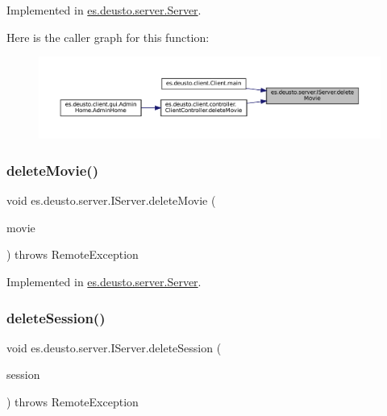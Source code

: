 Implemented in \mbox{\hyperlink{classes_1_1deusto_1_1server_1_1_server_a6501e4103fcc2ef691c15e4e02f7136c}{es.\+deusto.\+server.\+Server}}.

Here is the caller graph for this function\+:
\nopagebreak
\begin{figure}[H]
\begin{center}
\leavevmode
\includegraphics[width=350pt]{interfacees_1_1deusto_1_1server_1_1_i_server_a0b3243dc04d49f7659fefec4e4fb43b7_icgraph}
\end{center}
\end{figure}
\mbox{\label{interfacees_1_1deusto_1_1server_1_1_i_server_a98cc625828e17ef8b55aefcd9a3f604e}} 
\subsubsection{\texorpdfstring{deleteMovie()}{deleteMovie()}\hspace{0.1cm}{\footnotesize\ttfamily [2/2]}}
{\footnotesize\ttfamily void es.\+deusto.\+server.\+I\+Server.\+delete\+Movie (\begin{DoxyParamCaption}\item[{\mbox{\hyperlink{classes_1_1deusto_1_1server_1_1data_1_1_movie_d_t_o}{Movie\+D\+TO}}}]{movie }\end{DoxyParamCaption}) throws Remote\+Exception}



Implemented in \mbox{\hyperlink{classes_1_1deusto_1_1server_1_1_server_a9821a6a51f378535746f26fde396ade5}{es.\+deusto.\+server.\+Server}}.

\mbox{\label{interfacees_1_1deusto_1_1server_1_1_i_server_a69878460a3fb5dfc077308e1cd3a8d34}} 
\subsubsection{\texorpdfstring{deleteSession()}{deleteSession()}}
{\footnotesize\ttfamily void es.\+deusto.\+server.\+I\+Server.\+delete\+Session (\begin{DoxyParamCaption}\item[{\mbox{\hyperlink{classes_1_1deusto_1_1server_1_1data_1_1_session_d_t_o}{Session\+D\+TO}}}]{session }\end{DoxyParamCaption}) throws Remote\+Exception}



